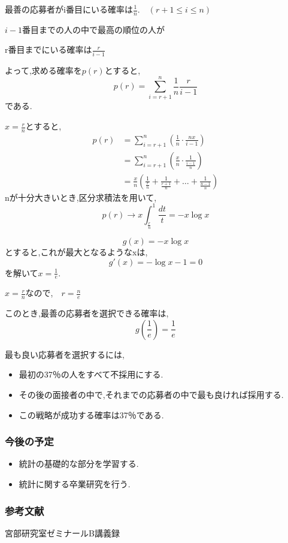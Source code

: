 \documentclass[dvipdfmx,11pt]{beamer}
\begin{document}
\begin{frame}
最善の応募者がi番目にいる確率は$ \frac{1}{n} $.　$ (r+1 \leq i \leq n) $

$i-1$番目までの人の中で最高の順位の人が

r番目までにいる確率は$ \frac{r}{i-1} $

よって,求める確率を$p(r)$とすると,
\[ p(r) = \sum_{i=r+1}^n \frac{1}{n} \frac{r}{i-1} \]
である.

\end{frame}

\begin{frame}
$ x= \frac{r}{n} $とすると,
\begin{align*}
p(r) &= \sum_{i=r+1}^n \left( \frac{1}{n} \cdot \frac{nx}{i-1} \right)  \\
      &= \sum_{i=r+1}^n \left( \frac{x}{n} \cdot \frac{1}{\frac{i-1}{n}} \right)  \\
      &= \frac{x}{n} \left( \frac{1}{\frac{r}{n}} + \frac{1}{\frac{r+1}{n}} + \ldots + \frac{1}{\frac{n-1}{n}} \right)
\end{align*}
nが十分大きいとき,区分求積法を用いて,
\[ p(r) \to x \int_{\frac{r}{n}}^{1} \frac{dt}{t} = -x \log x \]
\end{frame}

\begin{frame}
\[ g(x) = -x \log x \]
とすると,これが最大となるようなxは,
\[ g'(x) = -\log x-1 = 0 \]
を解いて$ x = \frac{1}{e} $.

$ x = \frac{r}{n} $なので,　$ r = \frac{n}{e} $

このとき,最善の応募者を選択できる確率は,
\[ g \left( \frac{1}{e} \right) = \frac{1}{e} \]
\end{frame}

\begin{frame}
最も良い応募者を選択するには,
\begin{itemize}
 \item 最初の37％の人をすべて不採用にする.
 \item その後の面接者の中で,それまでの応募者の中で最も良ければ採用する.
 \item この戦略が成功する確率は37％である.
\end{itemize}
\end{frame}

\begin{frame}
\frametitle{今後の予定}
\begin{itemize}
 \item 統計の基礎的な部分を学習する.
 \item 統計に関する卒業研究を行う.
\end{itemize}
\end{frame}

\begin{frame}
\frametitle{参考文献}
宮部研究室ゼミナールB講義録
\end{frame}
\end{document}
